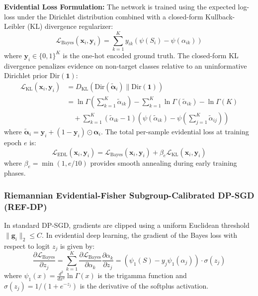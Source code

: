 \documentclass[pdflatex,sn-vancouver-num,referee,lineno]{sn-jnl}
\theoremstyle{thmstyleone}
\theoremstyle{thmstylethree}
\begin{document}
\noindent \textbf{Evidential Loss Formulation:} The network is trained using the expected log-loss under the Dirichlet distribution combined with a closed-form Kullback-Leibler (KL) divergence regularizer:
\begin{equation}
    \mathcal{L}_{\text{Bayes}}(\mathbf{x}_i, \mathbf{y}_i) = \sum_{k=1}^K y_{ik} \left( \psi(S_i) - \psi(\alpha_{ik}) \right)
\end{equation}
where $\mathbf{y}_i \in \{0, 1\}^K$ is the one-hot encoded ground truth. The closed-form KL divergence penalizes evidence on non-target classes relative to an uninformative Dirichlet prior $\text{Dir}(\mathbf{1})$:
\begin{align}
    \mathcal{L}_{\text{KL}}(\mathbf{x}_i, \mathbf{y}_i) &= D_{\text{KL}}\left(\text{Dir}(\tilde{\boldsymbol{\alpha}}_i) \parallel \text{Dir}(\mathbf{1})\right) \nonumber \\
    &= \ln \Gamma\left(\sum_{k=1}^K \tilde{\alpha}_{ik}\right) - \sum_{k=1}^K \ln \Gamma(\tilde{\alpha}_{ik}) - \ln \Gamma(K) \nonumber \\
    &\quad + \sum_{k=1}^K (\tilde{\alpha}_{ik} - 1)\left( \psi(\tilde{\alpha}_{ik}) - \psi\left(\sum_{j=1}^K \tilde{\alpha}_{ij}\right) \right)
\end{align}
where $\tilde{\boldsymbol{\alpha}}_i = \mathbf{y}_i + (1 - \mathbf{y}_i) \odot \boldsymbol{\alpha}_i$. The total per-sample evidential loss at training epoch $e$ is:
\begin{equation}
    \mathcal{L}_{\text{EDL}}(\mathbf{x}_i, \mathbf{y}_i) = \mathcal{L}_{\text{Bayes}}(\mathbf{x}_i, \mathbf{y}_i) + \beta_e \mathcal{L}_{\text{KL}}(\mathbf{x}_i, \mathbf{y}_i)
\end{equation}
where $\beta_e = \min(1, e/10)$ provides smooth annealing during early training phases.

\subsubsection{Riemannian Evidential-Fisher Subgroup-Calibrated DP-SGD (REF-DP)}
\label{sec:sc_dpsgd}

In standard DP-SGD, gradients are clipped using a uniform Euclidean threshold $\|\mathbf{g}_i\|_2 \le C$. In evidential deep learning, the gradient of the Bayes loss with respect to logit $z_j$ is given by:
\begin{equation}
    \frac{\partial \mathcal{L}_{\text{Bayes}}}{\partial z_j} = \sum_{k=1}^K \frac{\partial \mathcal{L}_{\text{Bayes}}}{\partial \alpha_k} \frac{\partial \alpha_k}{\partial z_j} = \left(\psi_1(S) - y_j \psi_1(\alpha_j)\right) \cdot \sigma(z_j)
\end{equation}
where $\psi_1(x) = \frac{d^2}{dx^2} \ln \Gamma(x)$ is the trigamma function and $\sigma(z_j) = 1/(1+e^{-z_j})$ is the derivative of the softplus activation. 
\end{document}
